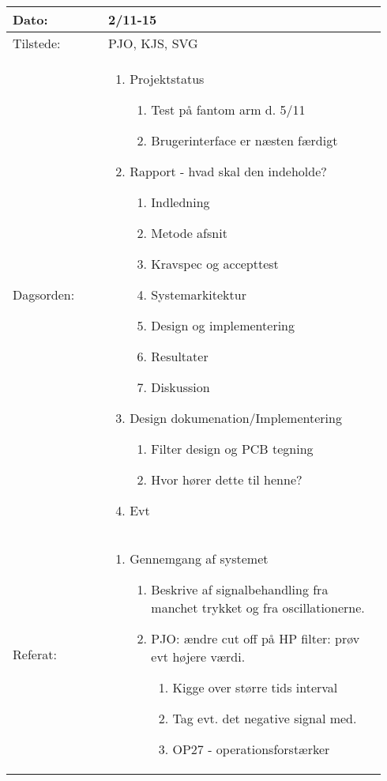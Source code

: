 	\begin{longtable}{|p{0.24\linewidth}|p{0.7\linewidth}|}
		\hline
		Dato: & 2/11-15\\ \hline
		Tilstede: & PJO, KJS, SVG\\ \hline
		Dagsorden: &
		\begin{enumerate}
			\item Projektstatus
			\begin{enumerate}
				\item Test på fantom arm d. 5/11 
				\item Brugerinterface er næsten færdigt
			\end{enumerate}
			\item Rapport - hvad skal den indeholde? 
			\begin{enumerate}
				\item Indledning
				\item Metode afsnit
				\item Kravspec og accepttest
				\item Systemarkitektur
				\item Design og implementering
				\item Resultater 
				\item Diskussion
			\end{enumerate}
			\item Design dokumenation/Implementering
			\begin{enumerate}
				\item Filter design og PCB tegning 
				\item Hvor hører dette til henne? 
			\end{enumerate}
			\item Evt
		\end{enumerate}
		\\ \hline
		Referat: & 
		\begin{enumerate}
			\item Gennemgang af systemet
			\begin{enumerate}
				\item Beskrive af signalbehandling fra manchet trykket og fra oscillationerne. 
				\item PJO: ændre cut off på HP filter: prøv evt højere værdi. 
				\begin{enumerate}
					\item Kigge over større tids interval
					\item Tag evt. det negative signal med. 
					\item OP27 - operationsforstærker

\end{enumerate}
\end{enumerate}
\end{enumerate}
\end{longtable}
